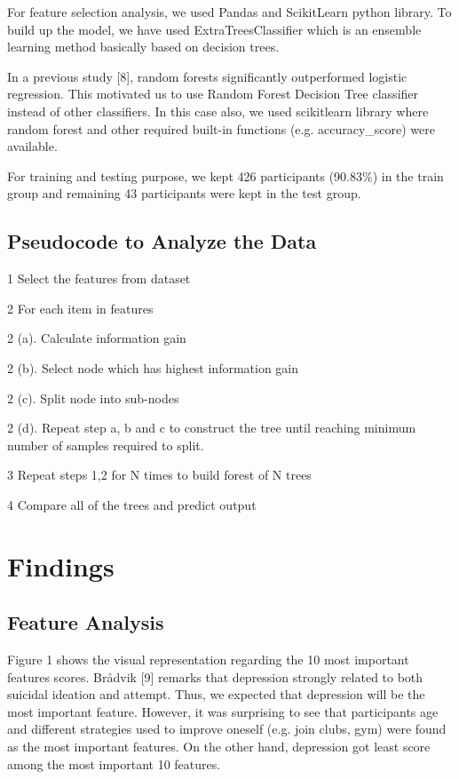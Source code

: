 \documentclass[conference]{IEEEtran}
\begin{document}
For feature selection analysis, we used Pandas and Scikit\-Learn python library. To build up the model, we have used ExtraTreesClassifier which is an ensemble learning method basically based on decision trees.

In a previous study [8], random forests significantly outperformed logistic regression. This motivated us to use Random Forest Decision Tree classifier instead of other classifiers. In this case also, we used scikit\-learn library where random forest and other required built-in functions (e.g. accuracy\_score) were available. 

For training and testing purpose, we kept 426 participants (90.83\%) in the train group and remaining 43 participants were kept in the test group.


\subsection{Pseudocode to Analyze the Data}



1\: Select the features from dataset

2\: For each item in features

2 (a). Calculate information gain

2 (b). Select node which has highest information gain

2 (c). Split node into sub-nodes

2 (d). Repeat step a, b and c to construct the tree until 		  reaching minimum number of samples required to split.

3\: Repeat steps 1,2 for N times to build forest of N trees

4\: Compare all of the trees and predict output

\section{Findings}

\subsection{Feature Analysis}
Figure 1 shows the visual representation regarding the 10 most important features scores. Brådvik [9] remarks that depression strongly related to both suicidal ideation and attempt. Thus, we expected that depression will be the most important feature. However, it was surprising to see that participants age and different strategies used to improve oneself (e.g. join clubs, gym) were found as the most important features. On the other hand, depression got least score among the most important 10 features.
\end{document}
